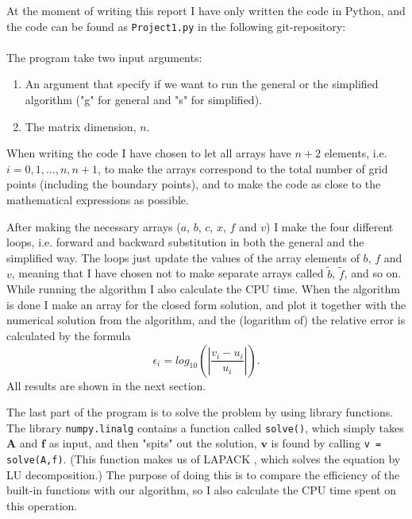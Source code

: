 \documentclass[12pt, a4paper]{article}
\begin{document}
At the moment of writing this report I have only written the code in Python, and the code can be found as
\texttt{Project1.py} in the following git-repository: \vspace{0.5cm} \\ 
 \vspace{0.5cm} \\ 
The program take two input arguments: 
\begin{enumerate}
\item An argument that specify if we want to run the general or the simplified algorithm ("g" for 
general and "s" for simplified). 
\item The matrix dimension, $n$. 
\end{enumerate}  

When writing the code I have chosen to let all arrays have $n+2$ elements, i.e. $i = 0,1,\dots,n,n+1$, to 
make the arrays correspond to the total number of grid points (including the boundary points), and 
to make the code as close to the mathematical expressions as possible.

After making the necessary arrays ($a$, $b$, $c$, $x$, $f$ and $v$) I make the four different loops, i.e. 
forward and backward substitution in both the general and the simplified way. The loops just update the 
values of the array elements of $b$, $f$ and $v$, meaning that I have chosen not to make separate arrays 
called $\tilde{b}$, $\tilde{f}$, and so on. While running the algorithm I also calculate the CPU time. 
When the algorithm is done I make an array for the closed form solution, and plot it together with the 
numerical solution from the algorithm, and the (logarithm of) the relative error is calculated by the
formula
\begin{equation}
\epsilon_i = log_{10}\left(\left| \frac{v_i - u_i}{u_i} \right| \right). 
\label{eq:error}
\end{equation}
All results are shown in the next section. 
   
The last part of the program is to solve the problem by using library functions. The library 
\texttt{numpy.linalg} \cite{numpy.linalg} contains a function called \texttt{solve()}, which simply takes 
$\mathbf{A}$ and $\mathbf{f}$ as input, and then "spits" out the solution, $\mathbf{v}$ is found by calling 
\texttt{v = solve(A,f)}. (This function makes us of LAPACK \cite{LAPACK}, which solves the equation by 
LU decomposition.) The purpose of doing this is to compare the efficiency of 
the built-in functions with our algorithm, so I also calculate the CPU time spent on this operation. 
\end{document}
